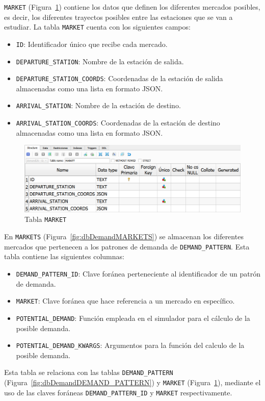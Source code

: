 \texttt{MARKET} (Figura~\ref{fig:dbDemandMARKET}) contiene los datos que definen los diferentes mercados posibles, es decir, los  diferentes trayectos posibles entre las estaciones que se van a estudiar. La tabla \texttt{MARKET} cuenta con los siguientes campos:

\begin{itemize}
    \item \texttt{ID}: Identificador único que recibe cada mercado.
    \item \texttt{DEPARTURE\_STATION}: Nombre de la estación de salida.
    \item \texttt{DEPARTURE\_STATION\_COORDS}: Coordenadas de la estación de salida almacenadas como una lista en formato \acrshort{JSON}.
    \item \texttt{ARRIVAL\_STATION}: Nombre de la estación de destino.
    \item \texttt{ARRIVAL\_STATION\_COORDS}: Coordenadas de la estación de destino almacenadas como una lista en formato \acrshort{JSON}.
\end{itemize}

\begin{figure}[H]
\centering
\includegraphics[width=.9\textwidth]{fig/Tablas base de datos/Demanda/MARKET.png}
\caption{Tabla \texttt{MARKET}}
\label{fig:dbDemandMARKET}
\end{figure}

En \texttt{MARKETS} (Figura~\ref{fig:dbDemandMARKETS}) se almacenan los diferentes mercados que pertenecen a los patrones de demanda de \texttt{DEMAND\_PATTERN}. Esta tabla contiene las siguientes columnas:

\begin{itemize}
    \item \texttt{DEMAND\_PATTERN\_ID}: Clave foránea perteneciente al identificador de un patrón de demanda.
    \item \texttt{MARKET}: Clave foránea que hace referencia a un mercado en específico.
    \item \texttt{POTENTIAL\_DEMAND}: Función empleada en el simulador para el cálculo de la posible demanda.
    \item \texttt{POTENTIAL\_DEMAND\_KWARGS}: Argumentos para la función del calculo de la posible demanda.
\end{itemize}
Esta tabla se relaciona con las tablas \texttt{DEMAND\_PATTERN} (Figura~\ref{fig:dbDemandDEMAND_PATTERN}) y \texttt{MARKET} (Figura~\ref{fig:dbDemandMARKET}), mediante el uso de las claves foráneas \texttt{DEMAND\_PATTERN\_ID} y \texttt{MARKET} respectivamente.

